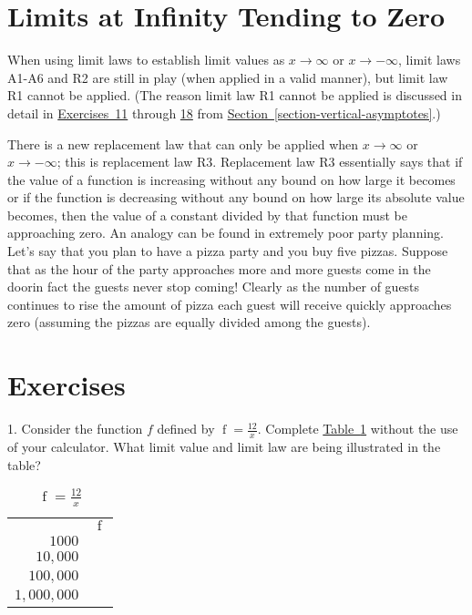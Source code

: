 \documentclass[12pt,]{book}
\theoremstyle{plain}
\theoremstyle{definition}
\numberwithin{equation}{section}
\newcommand{\hrulemedium}{\noalign{\hrule height 0.07em}}
\newcommand{\hrulethick} {\noalign{\hrule height 0.11em}}
\providecommand\phantomsection{}
\newcommand{\fe}[2]{\mathop{{#1}{\left(#2\right)}}}
\begin{document}
\section[Limits at Infinity Tending to Zero]{Limits at Infinity Tending to Zero}\label{section-limits-at-infinity-tending-to-zero}
When using limit laws to establish limit values as \(x\to\infty\) or \(x\to-\infty\), limit laws A1-A6 and R2 are still in play (when applied in a valid manner), but limit law R1 cannot be applied. (The reason limit law R1 cannot be applied is discussed in detail in \hyperref[exercise-hear-me-first]{Exercises~11} through \hyperref[exercise-hear-me-last]{18} from \hyperref[section-vertical-asymptotes]{Section~\ref*{section-vertical-asymptotes}}.)%
\par
There is a new replacement law that can only be applied when \(x\to\infty\) or \(x\to-\infty\); this is replacement law R3. Replacement law R3 essentially says that if the value of a function is increasing without any bound on how large it becomes or if the function is decreasing without any bound on how large its absolute value becomes, then the value of a constant divided by that function must be approaching zero. An analogy can be found in extremely poor party planning. Let's say that you plan to have a pizza party and you buy five pizzas. Suppose that as the hour of the party approaches more and more guests come in the door\textemdash{}in fact the guests never stop coming! Clearly as the number of guests continues to rise the amount of pizza each guest will receive quickly approaches zero (assuming the pizzas are equally divided among the guests).%
\typeout{************************************************}
\typeout{************************************************}
\section*{Exercises}\label{exercises-9}

\begin{exerciselist}
\item[1.]\phantomsection\hypertarget{exercise-85}{\null}Consider the function \(f\) defined by \(\fe{f}{x}=\frac{12}{x}\). Complete \hyperref[table-limit-to-zero]{Table~\ref*{table-limit-to-zero}} without the use of your calculator. What limit value and limit law are being illustrated in the table?%
\begin{table}
\centering
\caption{\(\fe{f}{x}=\frac{12}{x}\)\label{table-limit-to-zero}}
\begin{tabular}{rl}\hrulethick
\multicolumn{1}{c}{\(x\)}&\multicolumn{1}{c}{\(\fe{f}{x}\)}\\\hrulemedium
\(1000\)&\\
\(10{,}000\)&\\
\(100{,}000\)&\\
\(1{,}000{,}000\)&
\end{tabular}
\end{table}
\par\smallskip
\end{exerciselist}
\typeout{************************************************}
\typeout{************************************************}
\end{document}
